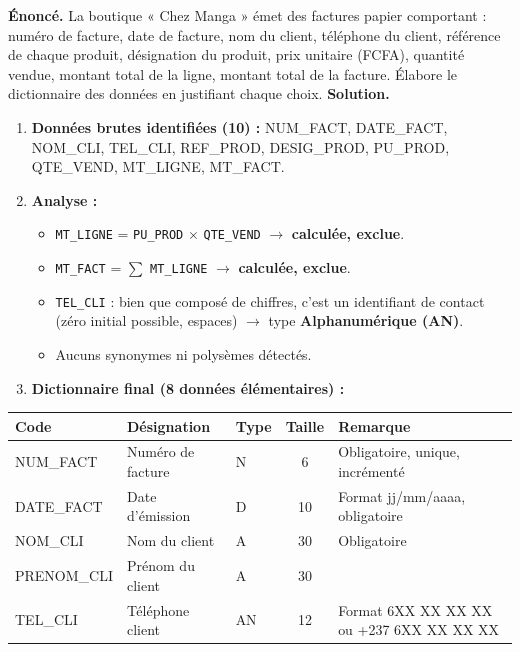 \documentclass[11pt]{article}
\begin{document}
\begin{exoresolu}
\textbf{Énoncé.} La boutique « Chez Manga » émet des factures papier comportant : numéro de facture, date de facture, nom du client, téléphone du client, référence de chaque produit, désignation du produit, prix unitaire (FCFA), quantité vendue, montant total de la ligne, montant total de la facture. Élabore le dictionnaire des données en justifiant chaque choix.
\tcblower
\textbf{Solution.}
\begin{enumerate}
  \item \textbf{Données brutes identifiées (10) :} NUM\_FACT, DATE\_FACT, NOM\_CLI, TEL\_CLI, REF\_PROD, DESIG\_PROD, PU\_PROD, QTE\_VEND, MT\_LIGNE, MT\_FACT.
  \item \textbf{Analyse :}
  \begin{itemize}
    \item \texttt{MT\_LIGNE} = \texttt{PU\_PROD} $\times$ \texttt{QTE\_VEND} $\rightarrow$ \textbf{calculée, exclue}.
    \item \texttt{MT\_FACT} = $\sum$ \texttt{MT\_LIGNE} $\rightarrow$ \textbf{calculée, exclue}.
    \item \texttt{TEL\_CLI} : bien que composé de chiffres, c'est un identifiant de contact (zéro initial possible, espaces) $\rightarrow$ type \textbf{Alphanumérique (AN)}.
    \item Aucuns synonymes ni polysèmes détectés.
  \end{itemize}
  \item \textbf{Dictionnaire final (8 données élémentaires) :}
\end{enumerate}
\begin{center}
\begin{tabularx}{\linewidth}{|l|X|l|c|X|}
\hline
\rowcolor{popblueL} \textbf{Code} & \textbf{Désignation} & \textbf{Type} & \textbf{Taille} & \textbf{Remarque} \\
\hline
NUM\_FACT & Numéro de facture & N & 6 & Obligatoire, unique, incrémenté \\
\hline
DATE\_FACT & Date d'émission & D & 10 & Format jj/mm/aaaa, obligatoire \\
\hline
NOM\_CLI & Nom du client & A & 30 & Obligatoire \\
\hline
PRENOM\_CLI & Prénom du client & A & 30 &  \\
\hline
TEL\_CLI & Téléphone client & AN & 12 & Format 6XX XX XX XX ou +237 6XX XX XX XX \\
\hline

\end{tabularx}
\end{center}
\end{exoresolu}
\end{document}
